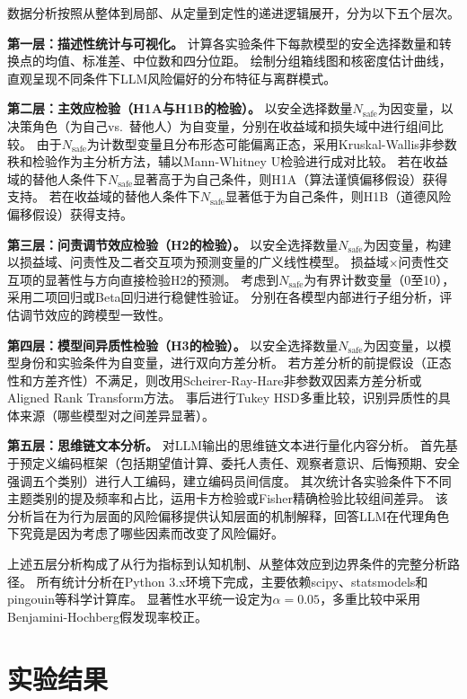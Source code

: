 \documentclass[journal]{vgtc}
\begin{document}
数据分析按照从整体到局部、从定量到定性的递进逻辑展开，分为以下五个层次。

\textbf{第一层：描述性统计与可视化。}
计算各实验条件下每款模型的安全选择数量和转换点的均值、标准差、中位数和四分位距。
绘制分组箱线图和核密度估计曲线，直观呈现不同条件下LLM风险偏好的分布特征与离群模式。

\textbf{第二层：主效应检验（H1A与H1B的检验）。}
以安全选择数量$N_{\text{safe}}$为因变量，以决策角色（为自己vs.\ 替他人）为自变量，分别在收益域和损失域中进行组间比较。
由于$N_{\text{safe}}$为计数型变量且分布形态可能偏离正态，采用Kruskal-Wallis非参数秩和检验作为主分析方法，辅以Mann-Whitney U检验进行成对比较。
若在收益域的替他人条件下$N_{\text{safe}}$显著高于为自己条件，则H1A（算法谨慎偏移假设）获得支持。
若在收益域的替他人条件下$N_{\text{safe}}$显著低于为自己条件，则H1B（道德风险偏移假设）获得支持。

\textbf{第三层：问责调节效应检验（H2的检验）。}
以安全选择数量$N_{\text{safe}}$为因变量，构建以损益域、问责性及二者交互项为预测变量的广义线性模型。
损益域$\times$问责性交互项的显著性与方向直接检验H2的预测。
考虑到$N_{\text{safe}}$为有界计数变量（0至10），采用二项回归或Beta回归进行稳健性验证。
分别在各模型内部进行子组分析，评估调节效应的跨模型一致性。

\textbf{第四层：模型间异质性检验（H3的检验）。}
以安全选择数量$N_{\text{safe}}$为因变量，以模型身份和实验条件为自变量，进行双向方差分析。
若方差分析的前提假设（正态性和方差齐性）不满足，则改用Scheirer-Ray-Hare非参数双因素方差分析或Aligned Rank Transform方法。
事后进行Tukey HSD多重比较，识别异质性的具体来源（哪些模型对之间差异显著）。

\textbf{第五层：思维链文本分析。}
对LLM输出的思维链文本进行量化内容分析。
首先基于预定义编码框架（包括期望值计算、委托人责任、观察者意识、后悔预期、安全强调五个类别）进行人工编码，建立编码员间信度。
其次统计各实验条件下不同主题类别的提及频率和占比，运用卡方检验或Fisher精确检验比较组间差异。
该分析旨在为行为层面的风险偏移提供认知层面的机制解释，回答LLM在代理角色下究竟是因为考虑了哪些因素而改变了风险偏好。

上述五层分析构成了从行为指标到认知机制、从整体效应到边界条件的完整分析路径。
所有统计分析在Python 3.x环境下完成，主要依赖scipy、statsmodels和pingouin等科学计算库。
显著性水平统一设定为$\alpha = 0.05$，多重比较中采用Benjamini-Hochberg假发现率校正。

\section{实验结果}
\end{document}
